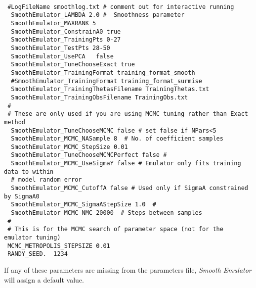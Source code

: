 \documentclass[UserManual.tex]{subfiles}
\begin{document}
{\tt
\begin{verbatim}
 #LogFileName smoothlog.txt # comment out for interactive running
  SmoothEmulator_LAMBDA 2.0 #  Smoothness parameter
  SmoothEmulator_MAXRANK 5
  SmoothEmulator_ConstrainA0 true
  SmoothEmulator_TrainingPts 0-27
  SmoothEmulator_TestPts 28-50
  SmoothEmulator_UsePCA   false
  SmoothEmulator_TuneChooseExact true
  SmoothEmulator_TrainingFormat training_format_smooth
  #SmoothEmulator_TrainingFormat training_format_surmise
  SmoothEmulator_TrainingThetasFilename TrainingThetas.txt
  SmoothEmulator_TrainingObsFilename TrainingObs.txt
 #
 # These are only used if you are using MCMC tuning rather than Exact method
  SmoothEmulator_TuneChooseMCMC false # set false if NPars<5
  SmoothEmulator_MCMC_NASample 8  # No. of coefficient samples
  SmoothEmulator_MCMC_StepSize 0.01
  SmoothEmulator_TuneChooseMCMCPerfect false #
  SmoothEmulator_MCMC_UseSigmaY false # Emulator only fits training data to within
  # model random error
  SmoothEmulator_MCMC_CutoffA false # Used only if SigmaA constrained by SigmaA0
  SmoothEmulator_MCMC_SigmaAStepSize 1.0  #
  SmoothEmulator_MCMC_NMC 20000  # Steps between samples 
 #
 # This is for the MCMC search of parameter space (not for the emulator tuning)
 MCMC_METROPOLIS_STEPSIZE 0.01
 RANDY_SEED.  1234
\end{verbatim}
}
If any of these parameters are missing from the parameters file, {\it Smooth Emulator} will assign a default value.
\end{document}
